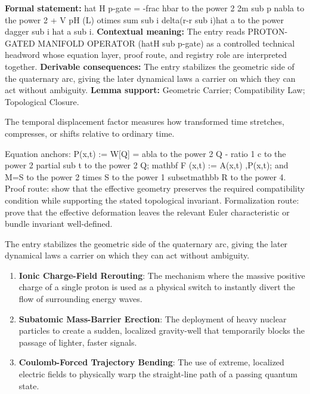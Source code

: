 \begingroup\footnotesize\setlength{\emergencystretch}{3em}\sloppy
\textbf{Formal statement:} hat H p-gate = -frac hbar to the power 2 2m sub p nabla to the power 2 + V pH (L) otimes sum sub i delta(r-r sub i)hat a to the power dagger sub i hat a sub i. \textbf{Contextual meaning:} The entry reads PROTON-GATED MANIFOLD OPERATOR (hatH sub p-gate) as a controlled technical headword whose equation layer, proof route, and registry role are interpreted together. \textbf{Derivable consequences:} The entry stabilizes the geometric side of the quaternary arc, giving the later dynamical laws a carrier on which they can act without ambiguity. \textbf{Lemma support:} Geometric Carrier; Compatibility Law; Topological Closure.\par
\endgroup

The temporal displacement factor measures how transformed time stretches, compresses, or shifts relative to ordinary time.

Equation anchors: P(x,t) := W[Q] = abla to the power 2 Q - ratio 1 c to the power 2 partial sub t to the power 2 Q; mathbf F (x,t) := A(x,t) ,P(x,t); and M=S to the power 2 times S to the power 1 subsetmathbb R to the power 4. Proof route: show that the effective geometry preserves the required compatibility condition while supporting the stated topological invariant. Formalization route: prove that the effective deformation leaves the relevant Euler characteristic or bundle invariant well-defined.

The entry stabilizes the geometric side of the quaternary arc, giving the later dynamical laws a carrier on which they can act without ambiguity.
\endgroup

\begin{enumerate}[leftmargin=1.6em,itemsep=6pt,topsep=4pt]
\item \textbf{Ionic Charge-Field Rerouting}: The mechanism where the massive positive charge of a single proton is used as a physical switch to instantly divert the flow of surrounding energy waves.
\item \textbf{Subatomic Mass-Barrier Erection}: The deployment of heavy nuclear particles to create a sudden, localized gravity-well that temporarily blocks the passage of lighter, faster signals.
\item \textbf{Coulomb-Forced Trajectory Bending}: The use of extreme, localized electric fields to physically warp the straight-line path of a passing quantum state.
\end{enumerate}

